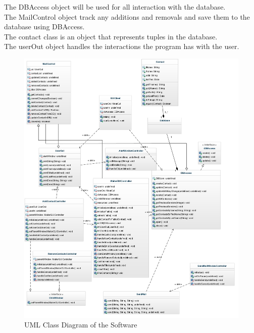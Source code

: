 \documentclass{article}
\begin{document}
The DBAccess object will be used for all interaction with the database. \\
The MailControl object track any additions and removals and save them to the database using DBAccess. \\
The contact class is an object that represents tuples in the database. \\
The userOut object handles the interactions the program has with the user. \\
\begin{figure}[H]
\centering
\includegraphics[width=180mm]{img/finalDiagrams/ClassDiagram.jpg}
\caption{UML Class Diagram of the Software \label{UML}}
\end{figure}

\end{document}
